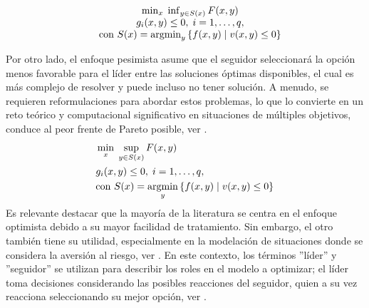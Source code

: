     \begin{equation}  \label{eq:EnfoqueOptimistaGeneral}
    \begin{matrix}
    & \min_{x} \; \inf_{y \in S(x)} F(x, y) \\& g_i(x, y)\leq 0,\;i=1,\ldots,q, \\
    & \text{con } S(x) = \operatorname*{argmin}_{y} \left\{ f(x, y) \mid v(x, y) \leq 0 \right\}
    \end{matrix}
    \end{equation}

Por otro lado, el enfoque pesimista asume que el seguidor seleccionará la opción menos favorable para el líder entre las soluciones óptimas disponibles, el cual es más complejo de resolver y puede incluso no tener solución. A menudo, se requieren reformulaciones para abordar estos problemas, lo que lo convierte en un reto teórico y computacional significativo en situaciones de múltiples objetivos, conduce al peor frente de Pareto posible, ver \cite{Sinha2017ARO}.
\begin{equation}
\begin{aligned}
& \min_{x} \; \sup_{y \in S(x)} F(x, y) \\& g_i(x, y)\leq 0,\;i=1,\ldots,q, \\
& \text{con } S(x) = \operatorname*{argmin}_{y} \left\{ f(x, y) \mid v(x, y) \leq 0 \right\}
\end{aligned}
\label{eq:EnfoquePesimistaGeneral}
\end{equation}
Es relevante destacar que la mayoría de la literatura se centra en el enfoque optimista debido a su mayor facilidad de tratamiento. Sin embargo, el otro también tiene su utilidad, especialmente en la modelación de situaciones donde se considera la aversión al riesgo, ver \cite{DempeyZemkoho2020}. En este contexto, los términos ''líder'' y ''seguidor'' se utilizan para describir los roles en el modelo a optimizar; el líder toma decisiones considerando las posibles reacciones del seguidor, quien a su vez reacciona seleccionando su mejor opción, ver \cite{Sinha2017ARO}.

